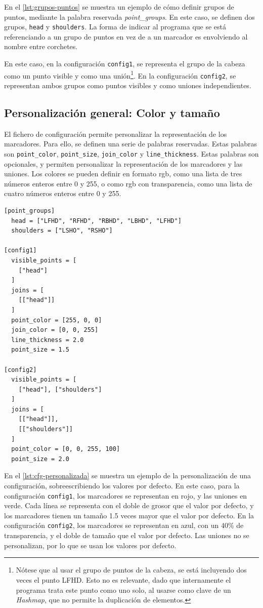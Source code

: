 En el \autoref{lst:grupos-puntos} se muestra un ejemplo de cómo definir grupos de puntos, mediante la palabra reservada \textit{point\_groups}. En este caso, se definen dos grupos, \texttt{head} y \texttt{shoulders}. La forma de indicar al programa que se está referenciando a un grupo de puntos en vez de a un marcador es envolviendo al nombre entre corchetes.

En este caso, en la configuración \texttt{config1}, se representa el grupo de la cabeza como un punto visible y como una unión\footnote{Nótese que al usar el grupo de puntos de la cabeza, se está incluyendo dos veces el punto \ac{LFHD}. Esto no es relevante, dado que internamente el programa trata este punto como uno solo, al usarse como clave de un \textit{Hashmap}, que no permite la duplicación de elementos.}. En la configuración \texttt{config2}, se representan ambos grupos como puntos visibles y como uniones independientes. 

\subsection{Personalización general: Color y tamaño}

El fichero de configuración permite personalizar la representación de los marcadores. Para ello, se definen una serie de palabras reservadas. Estas palabras son \texttt{point\_color}, \texttt{point\_size}, \texttt{join\_color} y \texttt{line\_thickness}. Estas palabras son opcionales, y permiten personalizar la representación de los marcadores y las uniones. Los colores se pueden definir en formato rgb, como una lista de tres números enteros entre 0 y 255, o como rgb con transparencia, como una lista de cuatro números enteros entre 0 y 255.

\begin{lstlisting}[style=mystyle, caption={Configuración personalizada}, label={lst:cfg-personalizada}]
[point_groups]
  head = ["LFHD", "RFHD", "RBHD", "LBHD", "LFHD"]
  shoulders = ["LSHO", "RSHO"]

[config1]
  visible_points = [
    ["head"]
  ]
  joins = [
    [["head"]]
  ]
  point_color = [255, 0, 0]
  join_color = [0, 0, 255]
  line_thickness = 2.0
  point_size = 1.5

[config2]
  visible_points = [
    ["head"], ["shoulders"]
  ]
  joins = [
    [["head"]], 
    [["shoulders"]]
  ]
  point_color = [0, 0, 255, 100]
  point_size = 2.0
\end{lstlisting}

En el \autoref{lst:cfg-personalizada} se muestra un ejemplo de la personalización de una configuración, sobreescribiendo los valores por defecto. En este caso, para la configuración \texttt{config1}, los marcadores se representan en rojo, y las uniones en verde. Cada línea se representa con el doble de grosor que el valor por defecto, y los marcadores tienen un tamaño 1.5 veces mayor que el valor por defecto. En la configuración \texttt{config2}, los marcadores se representan en azul, con un 40\% de transparencia, y el doble de tamaño que el valor por defecto. Las uniones no se personalizan, por lo que se usan los valores por defecto.

